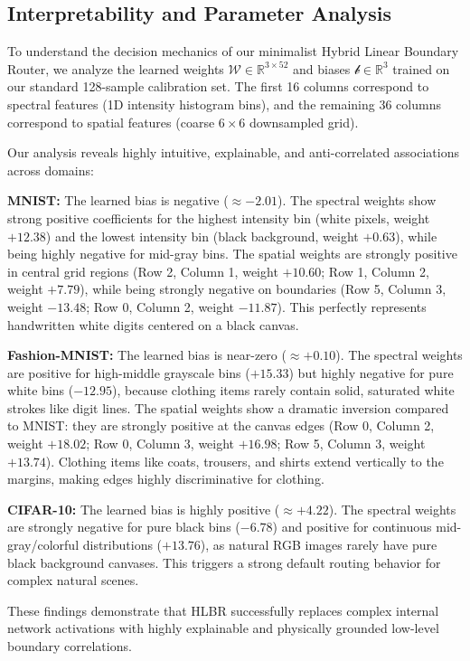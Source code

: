 \documentclass{article}
\theoremstyle{plain}
\theoremstyle{definition}
\theoremstyle{remark}
\begin{document}
\subsection{Interpretability and Parameter Analysis}
To understand the decision mechanics of our minimalist Hybrid Linear Boundary Router, we analyze the learned weights $\mathcal{W} \in \mathbb{R}^{3 \times 52}$ and biases $\mathcal{b} \in \mathbb{R}^3$ trained on our standard 128-sample calibration set. The first 16 columns correspond to spectral features (1D intensity histogram bins), and the remaining 36 columns correspond to spatial features (coarse $6\times 6$ downsampled grid).

Our analysis reveals highly intuitive, explainable, and anti-correlated associations across domains:

\textbf{MNIST:} The learned bias is negative ($\approx -2.01$). The spectral weights show strong positive coefficients for the highest intensity bin (white pixels, weight $+12.38$) and the lowest intensity bin (black background, weight $+0.63$), while being highly negative for mid-gray bins. The spatial weights are strongly positive in central grid regions (Row 2, Column 1, weight $+10.60$; Row 1, Column 2, weight $+7.79$), while being strongly negative on boundaries (Row 5, Column 3, weight $-13.48$; Row 0, Column 2, weight $-11.87$). This perfectly represents handwritten white digits centered on a black canvas.

\textbf{Fashion-MNIST:} The learned bias is near-zero ($\approx +0.10$). The spectral weights are positive for high-middle grayscale bins ($+15.33$) but highly negative for pure white bins ($-12.95$), because clothing items rarely contain solid, saturated white strokes like digit lines. The spatial weights show a dramatic inversion compared to MNIST: they are strongly positive at the canvas edges (Row 0, Column 2, weight $+18.02$; Row 0, Column 3, weight $+16.98$; Row 5, Column 3, weight $+13.74$). Clothing items like coats, trousers, and shirts extend vertically to the margins, making edges highly discriminative for clothing.

\textbf{CIFAR-10:} The learned bias is highly positive ($\approx +4.22$). The spectral weights are strongly negative for pure black bins ($-6.78$) and positive for continuous mid-gray/colorful distributions ($+13.76$), as natural RGB images rarely have pure black background canvases. This triggers a strong default routing behavior for complex natural scenes.

These findings demonstrate that HLBR successfully replaces complex internal network activations with highly explainable and physically grounded low-level boundary correlations.
\end{document}
